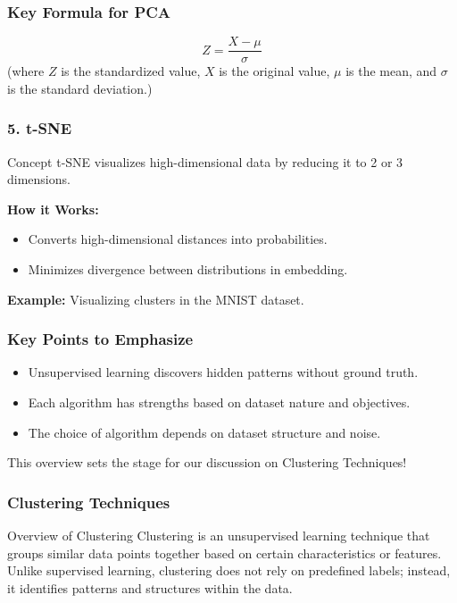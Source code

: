 \documentclass[aspectratio=169]{beamer}
\begin{document}
\begin{frame}[fragile]
    \frametitle{Key Formula for PCA}
    \begin{equation}
        Z = \frac{X - \mu}{\sigma}
    \end{equation}
    (where \(Z\) is the standardized value, \(X\) is the original value, \(\mu\) is the mean, and \(\sigma\) is the standard deviation.)
\end{frame}

\begin{frame}[fragile]
    \frametitle{5. t-SNE}
    \begin{block}{Concept}
        t-SNE visualizes high-dimensional data by reducing it to 2 or 3 dimensions.
    \end{block}
    \textbf{How it Works:}
    \begin{itemize}
        \item Converts high-dimensional distances into probabilities.
        \item Minimizes divergence between distributions in embedding.
    \end{itemize}
    \textbf{Example:} Visualizing clusters in the MNIST dataset.
\end{frame}

\begin{frame}[fragile]
    \frametitle{Key Points to Emphasize}
    \begin{itemize}
        \item Unsupervised learning discovers hidden patterns without ground truth.
        \item Each algorithm has strengths based on dataset nature and objectives.
        \item The choice of algorithm depends on dataset structure and noise.
    \end{itemize}
    This overview sets the stage for our discussion on Clustering Techniques!
\end{frame}

\begin{frame}[fragile]
    \frametitle{Clustering Techniques}
    \begin{block}{Overview of Clustering}
        Clustering is an unsupervised learning technique that groups similar data points together based on certain characteristics or features. Unlike supervised learning, clustering does not rely on predefined labels; instead, it identifies patterns and structures within the data.
    \end{block}
\end{frame}
\end{document}
